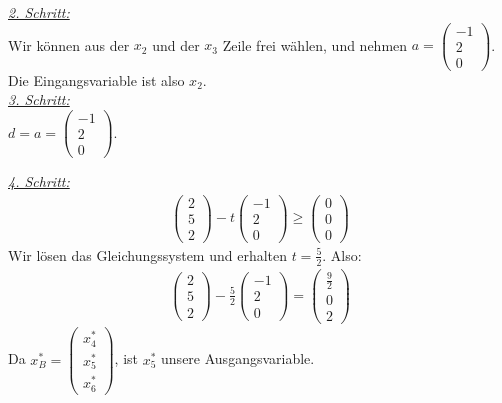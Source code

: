 \documentclass [a4paper,11pt]{article}
\begin{document}
\begin{enumerate}
\begin{enumerate}
            \underline{\textit{2. Schritt:}}\\
            Wir können aus der $x_2$ und der $x_3$ Zeile frei wählen, und nehmen $a = \begin{pmatrix} -1\\ 2\\ 0 \end{pmatrix}$. Die Eingangsvariable
            ist also $x_2$.\\

            \underline{\textit{3. Schritt:}}\\
            $d = a = \begin{pmatrix} -1\\ 2\\ 0 \end{pmatrix}$.

            \underline{\textit{4. Schritt:}}\\
            \begin{align*}
                \begin{pmatrix}
                    2\\ 5\\ 2
                \end{pmatrix} - t
                \begin{pmatrix}
                    -1\\ 2\\ 0
                \end{pmatrix} \geq
                \begin{pmatrix}
                    0\\ 0\\ 0
                \end{pmatrix}
            \end{align*}
            Wir lösen das Gleichungssystem und erhalten $t = \frac{5}{2}$. Also:
            \begin{align*}
                \begin{pmatrix}
                    2\\ 5\\ 2
                \end{pmatrix} - \frac{5}{2}
                \begin{pmatrix}
                    -1\\ 2\\ 0
                \end{pmatrix} =
                \begin{pmatrix}
                    \frac{9}{2}\\
                    0\\
                    2
                \end{pmatrix}
            \end{align*}
            Da $x_B^* = \begin{pmatrix} x_4^*\\ x_5^*\\ x_6^* \end{pmatrix}$, ist $x_5^*$ unsere Ausgangsvariable.\\


\end{enumerate}
\end{enumerate}
\end{document}
